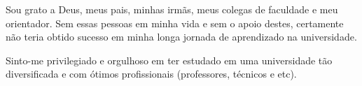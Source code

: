 \begin{agradecimentos}
Sou grato a Deus, meus pais, minhas irmãs, meus colegas de faculdade e meu orientador. Sem essas pessoas 
em minha vida e sem o apoio destes, certamente não teria obtido sucesso em minha longa jornada de aprendizado
na universidade.

Sinto-me privilegiado e orgulhoso em ter estudado em uma universidade tão diversificada e com ótimos profissionais (professores,
técnicos e etc).

\end{agradecimentos}
